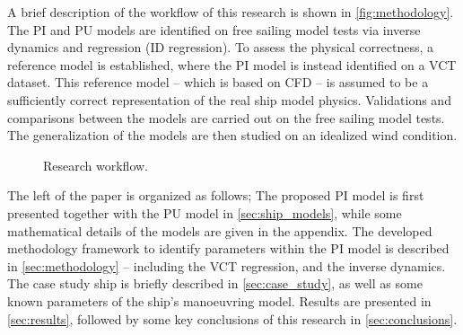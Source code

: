 A brief description of the workflow of this research is shown in \autoref{fig:methodology}.
The PI and PU models are identified on free sailing model tests via inverse dynamics \citep{faber_inverse_2018} and regression (ID regression). To assess the physical correctness, a reference model is established, where the PI model is instead identified on a VCT dataset. This reference model -- which is based on CFD -- is assumed to be a sufficiently correct representation of the real ship model physics.
Validations and comparisons between the models are carried out on the free sailing model tests. The generalization of the models are then studied on an idealized wind condition.
%
\begin{figure}[h]
  \centering
  
  \caption{Research workflow.}
  \label{fig:methodology}
\end{figure}

The left of the paper is organized as follows; The proposed PI model is first presented together with the PU 
 model in \autoref{sec:ship_models}, while some mathematical details of the models are given in the appendix. 
The developed methodology framework to identify parameters within the PI model is described in \autoref{sec:methodology} -- including the VCT regression, and the inverse dynamics. The case study ship is briefly described in \autoref{sec:case_study}, as well as some known parameters of the ship's manoeuvring model. Results are presented in \autoref{sec:results}, followed by some key conclusions of this research in \autoref{sec:conclusions}.